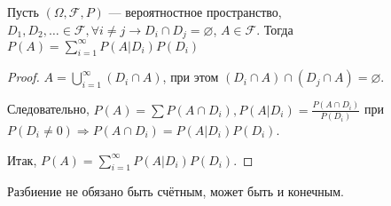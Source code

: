 \begin{claim}
  Пусть $(\Omega, \mathcal{F}, P)$ --- вероятностное пространство, $D_1, D_2, \ldots \in \mathcal{F}, \forall i \neq j \to D_i \cap D_j = \varnothing$, 
  $A \in \mathcal{F} $.
  Тогда $P(A) = \sum_{i=1}^\infty P(A | D_i)P(D_i)$

  \begin{proof}
	$A = \bigcup_{i=1}^\infty (D_i \cap A)$, при этом $(D_i \cap A) \cap (D_j \cap A) = \varnothing$.

	Следовательно, $P(A) = \sum P(A\cap D_i), P(A|D_i) = \frac{P(A\cap D_i)}{P(D_i)}$ при $P(D_i \neq 0) \Rightarrow 
	P(A\cap D_i) = P(A|D_i)P(D_i)$.

	Итак, $P(A) = \sum_{i=1}^\infty P(A|D_i)P(D_i)$.
  \end{proof}
\end{claim}

\begin{remark*}
  Разбиение не обязано быть счётным, может быть и конечным.
\end{remark*}

